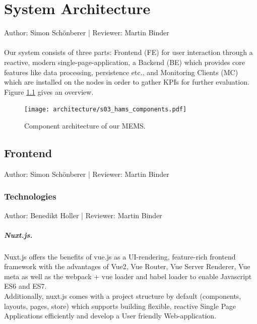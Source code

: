 \documentclass{scrreprt}
\begin{document}
	
	\label{userstory1}
	
	
	\label{userstory}
\chapter{System Architecture}
Author: Simon Sch\"onberer | Reviewer: Martin Binder\\ \\
Our system consists of three parts: Frontend (FE) for user interaction through a reactive, 
modern single-page-application, a Backend (BE) which provides core features like data processing,
persistence etc., and Monitoring Clients (MC) which are installed on the nodes in order to
gather KPIs for further evaluation. Figure \ref{sys-comp} gives an overview.

\begin{figure}[h]
	\centering
	\texttt{[image: architecture/s03\_hams\_components.pdf]}
	\caption{Component architecture of our MEMS.}
	\label{sys-comp}
\end{figure}

\section{Frontend}
Author: Simon Sch\"onberer | Reviewer: Martin Binder
\subsection{Technologies}
Author: Benedikt Holler | Reviewer: Martin Binder
\paragraph{Nuxt.js.} Nuxt.js offers the benefits of vue.js as a UI-rendering, feature-rich frontend framework with the advantages of Vue2, Vue Router, Vue Server Renderer, Vue meta as well as the webpack + vue loader and babel loader to enable Javascript ES6 and ES7. \\
Additionally, nuxt.js comes with a project structure by default (components, layouts, pages, store) which supports building flexible, reactive Single Page Applications efficiently and develop a User friendly Web-application. 
\end{document}
